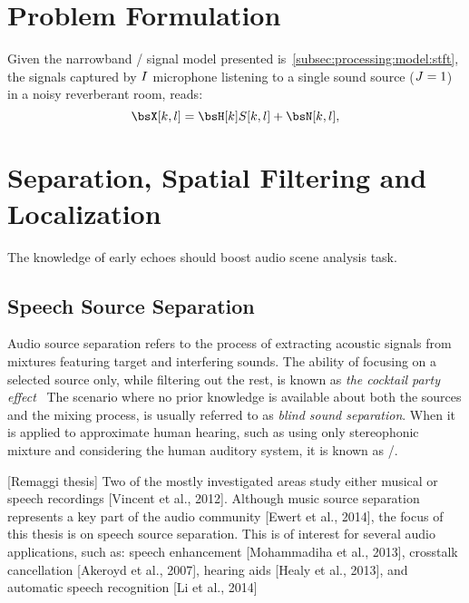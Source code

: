 \section{Problem Formulation}
Given the narrowband \STFT/ signal model presented is~\cref{subsec:processing:model:stft}, the signals captured by $I$ microphone listening to a single sound source ($J=1$) in a noisy reverberant room, reads:
\begin{equation}
    \MICS[k,l] = \FLTS[k] \SRC[k, l]+ \NSES[k,l]
    ,
\end{equation}







\section{Separation, Spatial Filtering and Localization}
The knowledge of early echoes should boost audio scene analysis task.

\subsection{Speech Source Separation}
Audio source separation refers to the process of extracting acoustic signals from mixtures featuring target and interfering sounds.
The ability of focusing on a selected source only, while filtering out the rest, is known as \textit{the cocktail party effect}~
The scenario where no prior knowledge is available about both the sources and the mixing process, is usually referred to as \textit{blind sound separation}.
When it is applied to approximate human hearing, such as using only stereophonic mixture and considering the human auditory system, it is known as \CASAdef/.

[Remaggi thesis]
Two of the mostly investigated areas study either musical or speech recordings [Vincent et al., 2012].
Although music source separation represents a key part of the audio community [Ewert et al., 2014], the focus of this thesis is on speech source separation.
This is of interest for several audio applications, such as: speech enhancement [Mohammadiha et al., 2013], crosstalk cancellation [Akeroyd et al., 2007], hearing aids [Healy et al., 2013], and automatic speech recognition [Li et al., 2014]

